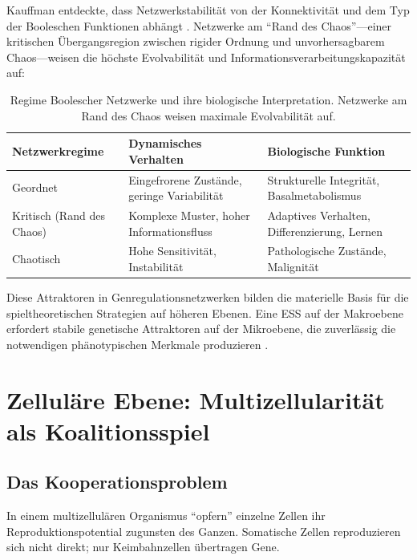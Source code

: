 \documentclass[12pt,a4paper]{article}
\theoremstyle{remark}
\begin{document}
Kauffman entdeckte, dass Netzwerkstabilit\"at von der Konnektivit\"at und dem Typ der Booleschen Funktionen abh\"angt \citep{BooleanPost}. Netzwerke am ``Rand des Chaos''---einer kritischen \"Ubergangsregion zwischen rigider Ordnung und unvorhersagbarem Chaos---weisen die h\"ochste Evolvabilit\"at und Informationsverarbeitungskapazit\"at auf:

\begin{table}[ht]
\centering
\caption{Regime Boolescher Netzwerke und ihre biologische Interpretation. Netzwerke am Rand des Chaos weisen maximale Evolvabilit\"at auf.}
\label{tab:network-regimes}
\begin{tabular}{lll}
\toprule
\textbf{Netzwerkregime} & \textbf{Dynamisches Verhalten} & \textbf{Biologische Funktion} \\
\midrule
Geordnet & Eingefrorene Zust\"ande, geringe Variabilit\"at & Strukturelle Integrit\"at, Basalmetabolismus \\
Kritisch (Rand des Chaos) & Komplexe Muster, hoher Informationsfluss & Adaptives Verhalten, Differenzierung, Lernen \\
Chaotisch & Hohe Sensitivit\"at, Instabilit\"at & Pathologische Zust\"ande, Malignit\"at \\
\bottomrule
\end{tabular}
\end{table}

Diese Attraktoren in Genregulationsnetzwerken bilden die materielle Basis f\"ur die spieltheoretischen Strategien auf h\"oheren Ebenen. Eine ESS auf der Makroebene erfordert stabile genetische Attraktoren auf der Mikroebene, die zuverl\"assig die notwendigen ph\"anotypischen Merkmale produzieren \citep{BooleanMicroarray,KauffmanOrigins}.

\section{Zellul\"are Ebene: Multizellularit\"at als Koalitionsspiel}
\label{sec:multicellularity}

\subsection{Das Kooperationsproblem}

In einem multizellul\"aren Organismus ``opfern'' einzelne Zellen ihr Reproduktionspotential zugunsten des Ganzen. Somatische Zellen reproduzieren sich nicht direkt; nur Keimbahnzellen \"ubertragen Gene.
\end{document}
